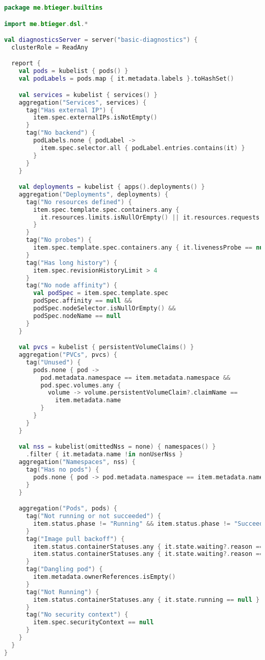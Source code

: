 \begin{lstlisting}[caption={BasicDiagnostics.kt},language=Kotlin,label=appendix:csr:bdkt]
package me.btieger.builtins

import me.btieger.dsl.*

val diagnosticsServer = server("basic-diagnostics") {
  clusterRole = ReadAny

  report {
    val pods = kubelist { pods() }
    val podLabels = pods.map { it.metadata.labels }.toHashSet()

    val services = kubelist { services() }
    aggregation("Services", services) {
      tag("Has external IP") {
        item.spec.externalIPs.isNotEmpty()
      }
      tag("No backend") {
        podLabels.none { podLabel ->
          item.spec.selector.all { podLabel.entries.contains(it) }
        }
      }
    }

    val deployments = kubelist { apps().deployments() }
    aggregation("Deployments", deployments) {
      tag("No resources defined") {
        item.spec.template.spec.containers.any { 
          it.resources.limits.isNullOrEmpty() || it.resources.requests.isNullOrEmpty() 
        }
      }
      tag("No probes") {
        item.spec.template.spec.containers.any { it.livenessProbe == null }
      }
      tag("Has long history") {
        item.spec.revisionHistoryLimit > 4
      }
      tag("No node affinity") {
        val podSpec = item.spec.template.spec
        podSpec.affinity == null && 
        podSpec.nodeSelector.isNullOrEmpty() && 
        podSpec.nodeName == null
      }
    }

    val pvcs = kubelist { persistentVolumeClaims() }
    aggregation("PVCs", pvcs) {
      tag("Unused") {
        pods.none { pod ->
          pod.metadata.namespace == item.metadata.namespace &&
          pod.spec.volumes.any { 
            volume -> volume.persistentVolumeClaim?.claimName == 
              item.metadata.name 
          }
        }
      }
    }

    val nss = kubelist(omittedNss = none) { namespaces() }
      .filter { it.metadata.name !in nonUserNss }
    aggregation("Namespaces", nss) {
      tag("Has no pods") {
        pods.none { pod -> pod.metadata.namespace == item.metadata.name }
      }
    }

    aggregation("Pods", pods) {
      tag("Not running or not succeeded") {
        item.status.phase != "Running" && item.status.phase != "Succeeded"
      }
      tag("Image pull backoff") {
        item.status.containerStatuses.any { it.state.waiting?.reason == "ImagePullBackOff" } ||
        item.status.containerStatuses.any { it.state.waiting?.reason == "ErrImagePull" }
      }
      tag("Dangling pod") {
        item.metadata.ownerReferences.isEmpty()
      }
      tag("Not Running") {
        item.status.containerStatuses.any { it.state.running == null }
      }
      tag("No security context") {
        item.spec.securityContext == null
      }
    }
  }
}
\end{lstlisting}

